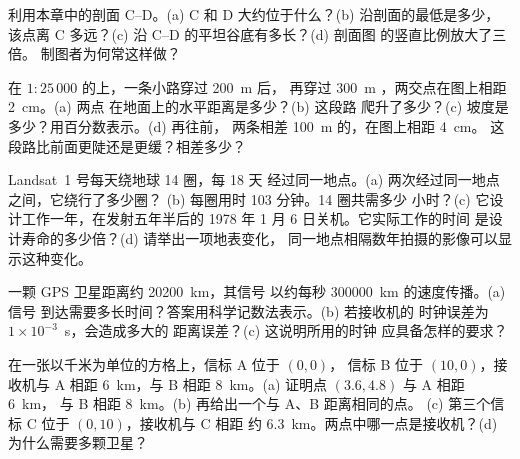 \begin{exercise}[$\star\star$]\label{exo:g9:maps-of-the-earth:7}
利用本章中的剖面 C--D。(a) C
和 D 大约位于什么？(b) 沿剖面的最低是多少，
该点离 C 多远？(c) 沿 C--D 的平坦谷底有多长？(d) 剖面图
的竖直比例放大了三倍。
制图者为何常这样做？
\end{exercise}

\begin{exercise}[$\star\star$]\label{exo:g9:maps-of-the-earth:8}
在 $1 : 25\,000$ 的上，一条小路穿过 \qty{200}{m} 后，
再穿过 \qty{300}{m} ，两交点在图上相距 \qty{2}{cm}。(a) 两点
在地面上的水平距离是多少？(b) 这段路
爬升了多少？(c) 坡度是多少？用百分数表示。(d) 再往前，
两条相差 \qty{100}{m} 的，在图上相距 \qty{4}{cm}。
这段路比前面更陡还是更缓？相差多少？
\end{exercise}

\begin{exercise}[$\star\star$]\label{exo:g9:maps-of-the-earth:9}
Landsat~1 号每天绕地球 14 圈，每 18 天
经过同一地点。(a) 两次经过同一地点之间，它绕行了多少圈？
(b) 每圈用时 103 分钟。14 圈共需多少
小时？(c) 它设计工作一年，在发射五年半后的
1978 年 1 月 6 日关机。它实际工作的时间
是设计寿命的多少倍？(d) 请举出一项地表变化，
同一地点相隔数年拍摄的影像可以显示这种变化。
\end{exercise}

\begin{exercise}[$\star\star$]\label{exo:g9:maps-of-the-earth:10}
一颗 GPS 卫星距离约 \qty{20200}{km}，其信号
以约每秒 \qty{300000}{km} 的速度传播。(a) 信号
到达需要多长时间？答案用科学记数法表示。(b) 若接收机的
时钟误差为 $1 \times 10^{-3}$~s，会造成多大的
距离误差？(c) 这说明所用的时钟
应具备怎样的要求？
\end{exercise}

\begin{exercise}[$\star\star\star$]\label{exo:g9:maps-of-the-earth:11}
在一张以千米为单位的方格上，信标 A 位于 $(0, 0)$，
信标 B 位于 $(10, 0)$，接收机与 A 相距 \qty{6}{km}，与 B 相距
\qty{8}{km}。(a) 证明点 $(3.6, 4.8)$ 与 A 相距 \qty{6}{km}，
与 B 相距 \qty{8}{km}。(b) 再给出一个与 A、B 距离相同的点。
(c) 第三个信标 C 位于 $(0, 10)$，接收机与 C 相距
约 \qty{6.3}{km}。两点中哪一点是接收机？(d) 
为什么需要多颗卫星？
\end{exercise}

